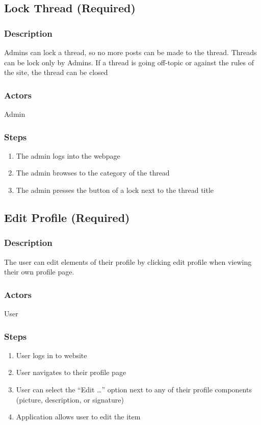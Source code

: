 \documentclass[12pt]{scrartcl}
\begin{document}
\subsection{Lock Thread (Required)}
\subsubsection{Description}
Admins can lock a thread, so no more posts can be made to the thread. Threads can be lock only by Admins.
If a thread is going off-topic or against the rules of the site, the thread can be closed 

\subsubsection{Actors}

Admin
\subsubsection{Steps}

\begin{enumerate}
\item The admin logs into the webpage
\item The admin browses to the category of the thread 
\item The admin presses the button of a lock next to the thread title
\end{enumerate}


\subsection{Edit Profile (Required)}
\subsubsection{Description}
The user can edit elements of their profile by clicking edit profile when viewing their own profile page.

\subsubsection{Actors}
User

\subsubsection{Steps}
\begin {enumerate}
\item User logs in to website
\item User navigates to their profile page
\item User can select the “Edit …” option next to any of their profile components (picture, description, or signature)
\item Application allows user to edit the item
\end {enumerate}
\end{document}
